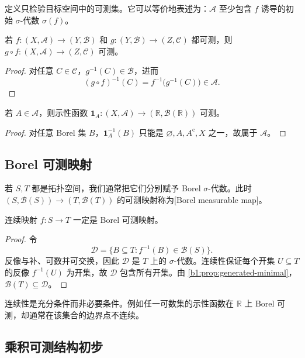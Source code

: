 定义只检验目标空间中的可测集。它可以等价地表述为：\(\mathcal A\) 至少包含 \(f\) 诱导的初始 \(\sigma\)-代数 \(\sigma(f)\)。

\begin{proposition}
\label{b1:prop:composition-measurable}
若 \(f:(X,\mathcal A)\to(Y,\mathcal B)\) 和 \(g:(Y,\mathcal B)\to(Z,\mathcal C)\) 都可测，则 \(g\circ f:(X,\mathcal A)\to(Z,\mathcal C)\) 可测。
\end{proposition}
\begin{proof}
对任意 \(C\in\mathcal C\)，\(g^{-1}(C)\in\mathcal B\)，进而
\[
(g\circ f)^{-1}(C)=f^{-1}\bigl(g^{-1}(C)\bigr)\in\mathcal A.
\]
\end{proof}

\begin{proposition}
\label{b1:prop:indicator-measurable}
若 \(A\in\mathcal A\)，则示性函数 \(\mathbf 1_A:(X,\mathcal A)\to(\mathbb R,\mathcal B(\mathbb R))\) 可测。
\end{proposition}
\begin{proof}
对任意 Borel 集 \(B\)，\(\mathbf 1_A^{-1}(B)\) 只能是 \(\varnothing,A,A^{\mathrm c},X\) 之一，故属于 \(\mathcal A\)。
\end{proof}

\subsection{Borel 可测映射}
\label{b1:subsec:010403}

若 \(S,T\) 都是拓扑空间，我们通常把它们分别赋予 Borel \(\sigma\)-代数。此时 \((S,\mathcal B(S))\to(T,\mathcal B(T))\) 的可测映射称为[Borel measurable map]。

\begin{proposition}
\label{b1:prop:continuous-borel}
连续映射 \(f:S\to T\) 一定是 Borel 可测映射。
\end{proposition}
\begin{proof}
令
\[
\mathcal D=\{B\subseteq T:f^{-1}(B)\in\mathcal B(S)\}.
\]
反像与补、可数并可交换，因此 \(\mathcal D\) 是 \(T\) 上的 \(\sigma\)-代数。连续性保证每个开集 \(U\subseteq T\) 的反像 \(f^{-1}(U)\) 为开集，故 \(\mathcal D\) 包含所有开集。由 \cref{b1:prop:generated-minimal}，\(\mathcal B(T)\subseteq\mathcal D\)。
\end{proof}

连续性是充分条件而非必要条件。例如任一可数集的示性函数在 \(\mathbb R\) 上 Borel 可测，却通常在该集合的边界点不连续。

\subsection{乘积可测结构初步}
\label{b1:subsec:010404}


